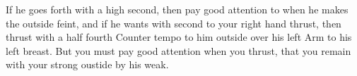 \exercise{}

If he goes forth with a high second, then pay good attention to when
he makes the outside feint, and if he wants with second to your right
hand thrust, then thrust with a half fourth Counter tempo to him
outside over his left Arm to his left breast. But you must pay good
attention when you thrust, that you remain with your strong oustide by
his weak.
